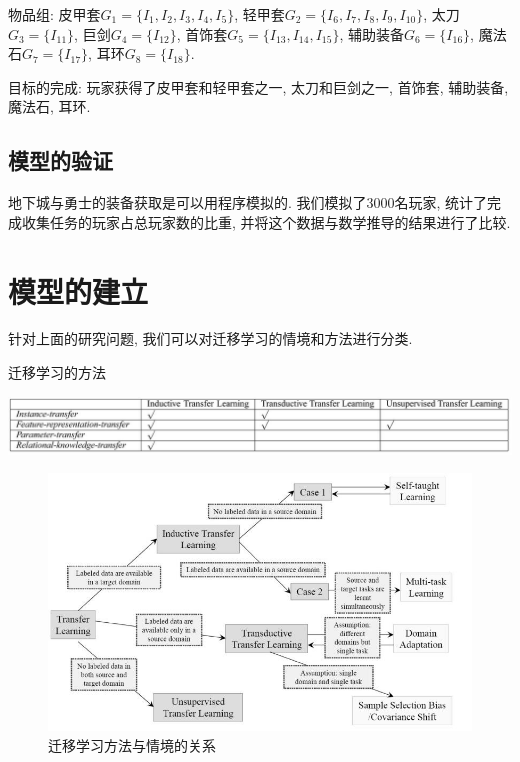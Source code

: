 \documentclass[10pt,journal,compsoc]{IEEEtran}
\begin{document}
  物品组: 皮甲套$G_1=\{I_1, I_2, I_3, I_4, I_5\}$, 轻甲套$G_2=\{I_6, I_7, I_8, I_9, I_{10}\}$, 太刀$G_3=\{I_{11}\}$, 巨剑$G_4=\{I_{12}\}$, 首饰套$G_5=\{I_{13}, I_{14}, I_{15}\}$, 辅助装备$G_6=\{I_{16}\}$, 魔法石$G_7=\{I_{17}\}$, 耳环$G_8=\{I_{18}\}$.
  
  
  
  目标的完成: 玩家获得了皮甲套和轻甲套之一, 太刀和巨剑之一, 首饰套, 辅助装备, 魔法石, 耳环. 



  \subsection{模型的验证}
    地下城与勇士的装备获取是可以用程序模拟的. 我们模拟了3000名玩家, 统计了完成收集任务的玩家占总玩家数的比重, 并将这个数据与数学推导的结果进行了比较. 

\section{模型的建立}

针对上面的研究问题, 我们可以对迁移学习的情境和方法进行分类. 

\begin{table}[!ht]
\centering
\caption{迁移学习的方法}
\label{tab:survey_method}
\includegraphics[width=40pc]{img/survey_tab3.jpg}
\end{table}

\begin{figure}[!ht]
\centering
\includegraphics[width=30pc]{img/survey_fig1.jpg}
\caption{迁移学习方法与情境的关系}
\label{fig:survey_method}
\end{figure}
\end{document}
